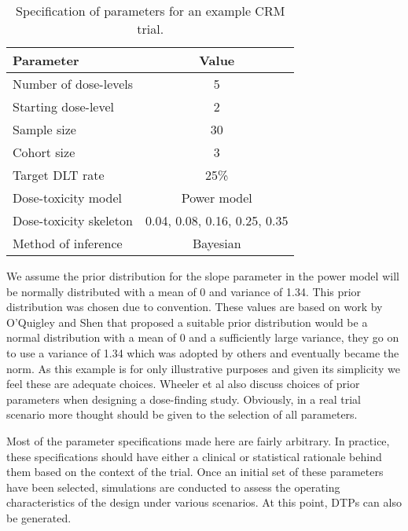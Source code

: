 \begin{table}[h!]
	\centering
	\caption{Specification of parameters for an example CRM trial. }
	\label{tab_tite-dtp:exampleCRMspecs}
	\begin{tabular}{l|c}
		\hline
		\textbf{Parameter}     & \textbf{Value}               \\ \hline
		Number of dose-levels  & 5                            \\
		Starting dose-level    & 2                            \\
		Sample size            & 30                           \\
		Cohort size            & 3                            \\
		Target DLT rate        & 25\%                         \\
		Dose-toxicity model    & Power model                  \\
		Dose-toxicity skeleton & 0.04, 0.08, 0.16, 0.25, 0.35 \\
		Method of inference    & Bayesian                     \\ \hline
	\end{tabular}
\end{table}

We assume the prior distribution for the slope parameter in the power model will be normally distributed with a mean of 0 and variance of 1.34. This prior distribution was chosen due to convention. These values are based on work by O'Quigley and Shen \cite{oquigleyContinualReassessmentMethod1996} that proposed a suitable prior distribution would be a normal distribution with a mean of 0 and a sufficiently large variance, they go on to use a variance of 1.34 which was adopted by others and eventually became the norm. As this example is for only illustrative purposes and given its simplicity we feel these are adequate choices. Wheeler et al \cite{wheelerHowDesignDosefinding2019} also discuss choices of prior parameters when designing a dose-finding study. Obviously, in a real trial scenario more thought should be given to the selection of all parameters. 

Most of the parameter specifications made here are fairly arbitrary. In practice, these specifications should have either a clinical or statistical rationale behind them based on the context of the trial. Once an initial set of these parameters have been selected, simulations are conducted to assess the operating characteristics of the design under various scenarios. At this point, DTPs can also be generated. 

